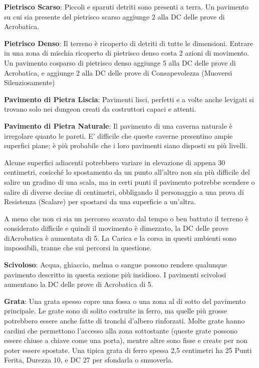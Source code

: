 \documentclass[a4paper,11pt,twoside,openany]{book}
\begin{document}
\textbf{Pietrisco Scarso}: Piccoli e sparuti detriti sono presenti a terra. Un pavimento su cui sia presente del pietrisco scarso aggiunge 2 alla DC delle prove di Acrobatica.

\textbf{Pietrisco Denso}: Il terreno è ricoperto di detriti di tutte le dimensioni. Entrare in una zona di mischia ricoperto di pietrisco denso costa 2 azioni di movimento. Un pavimento cosparso di pietrisco denso aggiunge 5 alla DC delle prove di Acrobatica, e aggiunge 2 alla DC delle prove di Consapevolezza (Muoversi Silenziosamente)

\textbf{Pavimento di Pietra Liscia}: Pavimenti lisci, perfetti e a volte anche levigati si trovano solo nei dungeon creati da costruttori capaci e attenti.

\textbf{Pavimento di Pietra Naturale}: Il pavimento di una caverna naturale è irregolare quanto le pareti. E' difficile che queste caverne presentino ampie superfici piane; è più probabile che i loro pavimenti siano disposti su più livelli.

Alcune superfici adiacenti potrebbero variare in elevazione di appena 30 centimetri, cosicché lo spostamento da un punto all'altro non sia più difficile del salire un gradino di una scala, ma in certi punti il pavimento potrebbe scendere o salire di diverse decine di centimetri, obbligando il personaggio a una prova di Resistenza (Scalare) per spostarsi da una superficie a un'altra.

A meno che non ci sia un percorso scavato dal tempo o ben battuto il terreno è considerato difficile e quindi il movimento è dimezzato, la DC delle prove diAcrobatica è aumentata di 5. La Carica e la corsa in questi ambienti sono impossibili, tranne che sui percorsi in questione.

\textbf{Scivoloso}: Acqua, ghiaccio, melma o sangue possono rendere qualunque pavimento descritto in questa sezione più insidioso. I pavimenti scivolosi aumentano la DC delle prove di Acrobatica di 5.

\textbf{Grata}: Una grata spesso copre una fossa o una zona al di sotto del pavimento principale. Le grate sono di solito costruite in ferro, ma quelle più grosse potrebbero essere anche fatte di tronchi d’albero rinforzati. Molte grate hanno cardini che permettono l’accesso alla zona sottostante (queste grate possono essere chiuse a chiave come una porta), mentre altre sono fisse e create per non poter essere spostate. Una tipica grata di ferro spessa 2,5 centimetri ha 25 Punti Ferita, Durezza 10, e DC 27 per sfondarla o smuoverla.
\end{document}
